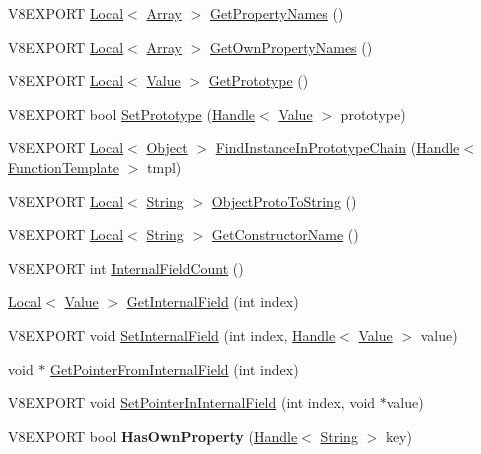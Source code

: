 \begin{DoxyCompactItemize}
\item 
V8\+E\+X\+P\+O\+R\+T \hyperlink{classv8_1_1_local}{Local}$<$ \hyperlink{classv8_1_1_array}{Array} $>$ \hyperlink{classv8_1_1_object_a0e28660353b6da64f9e2769260f31001}{Get\+Property\+Names} ()
\item 
V8\+E\+X\+P\+O\+R\+T \hyperlink{classv8_1_1_local}{Local}$<$ \hyperlink{classv8_1_1_array}{Array} $>$ \hyperlink{classv8_1_1_object_ab407b4e8dc83c3a75197f809d1465f7e}{Get\+Own\+Property\+Names} ()
\item 
V8\+E\+X\+P\+O\+R\+T \hyperlink{classv8_1_1_local}{Local}$<$ \hyperlink{classv8_1_1_value}{Value} $>$ \hyperlink{classv8_1_1_object_a171fc92c6e695d9c944f9e5d7670ed11}{Get\+Prototype} ()
\item 
V8\+E\+X\+P\+O\+R\+T bool \hyperlink{classv8_1_1_object_a2a1ab58bf92984255f767946eeff1199}{Set\+Prototype} (\hyperlink{classv8_1_1_handle}{Handle}$<$ \hyperlink{classv8_1_1_value}{Value} $>$ prototype)
\item 
V8\+E\+X\+P\+O\+R\+T \hyperlink{classv8_1_1_local}{Local}$<$ \hyperlink{classv8_1_1_object}{Object} $>$ \hyperlink{classv8_1_1_object_aa3b8aaece354c6af98b98e0ae9abe13d}{Find\+Instance\+In\+Prototype\+Chain} (\hyperlink{classv8_1_1_handle}{Handle}$<$ \hyperlink{classv8_1_1_function_template}{Function\+Template} $>$ tmpl)
\item 
V8\+E\+X\+P\+O\+R\+T \hyperlink{classv8_1_1_local}{Local}$<$ \hyperlink{classv8_1_1_string}{String} $>$ \hyperlink{classv8_1_1_object_a2dc22d2a2acf9eab4ed2965149e48af9}{Object\+Proto\+To\+String} ()
\item 
V8\+E\+X\+P\+O\+R\+T \hyperlink{classv8_1_1_local}{Local}$<$ \hyperlink{classv8_1_1_string}{String} $>$ \hyperlink{classv8_1_1_object_a4851a914d3d95b5eb7238c664fb7fd16}{Get\+Constructor\+Name} ()
\item 
V8\+E\+X\+P\+O\+R\+T int \hyperlink{classv8_1_1_object_affaee480d3f50d5ac7a640db5aa8e89d}{Internal\+Field\+Count} ()
\item 
\hyperlink{classv8_1_1_local}{Local}$<$ \hyperlink{classv8_1_1_value}{Value} $>$ \hyperlink{classv8_1_1_object_aa3324fdf652d8ac3b2f27faa0559231d}{Get\+Internal\+Field} (int index)
\item 
V8\+E\+X\+P\+O\+R\+T void \hyperlink{classv8_1_1_object_a94e24494687ea499471d41e914eeb90d}{Set\+Internal\+Field} (int index, \hyperlink{classv8_1_1_handle}{Handle}$<$ \hyperlink{classv8_1_1_value}{Value} $>$ value)
\item 
void $\ast$ \hyperlink{classv8_1_1_object_a8ef1f3e0d4f4cecc54d5e0248bc45694}{Get\+Pointer\+From\+Internal\+Field} (int index)
\item 
V8\+E\+X\+P\+O\+R\+T void \hyperlink{classv8_1_1_object_a5e79966b79d69ef3a7b3b0d91414ec2c}{Set\+Pointer\+In\+Internal\+Field} (int index, void $\ast$value)
\item 
\hypertarget{classv8_1_1_object_a58cf9219dca36c4b17f02544c59a2549}{}V8\+E\+X\+P\+O\+R\+T bool {\bfseries Has\+Own\+Property} (\hyperlink{classv8_1_1_handle}{Handle}$<$ \hyperlink{classv8_1_1_string}{String} $>$ key)\label{classv8_1_1_object_a58cf9219dca36c4b17f02544c59a2549}


\end{DoxyCompactItemize}
